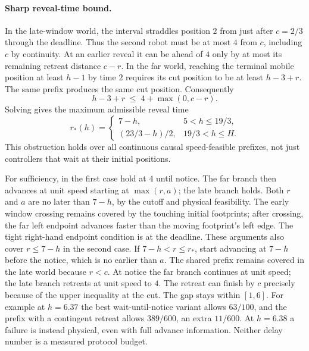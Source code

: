 \documentclass[11pt]{article}
\begin{document}
\paragraph{Sharp reveal-time bound.}
In the late-window world, the interval straddles position \(2\)
from just after \(c=2/3\) through the deadline. Thus the second
robot must be at most \(4\) from \(c\), including \(c\) by continuity.
At an earlier reveal it can be ahead of \(4\) only by at most
its remaining retreat distance \(c-r\). In the far world, reaching
the terminal mobile position at least \(h-1\) by time \(2\)
requires its cut position to be at least \(h-3+r\). The same
prefix produces the same cut position. Consequently
\[
  h-3+r\;\le\;4+\max(0,c-r).
\]
Solving gives the maximum admissible reveal time
\[
 r_*(h)=
 \begin{cases}
 7-h,&5<h\le19/3,\\
 (23/3-h)/2,&19/3<h\le H.
 \end{cases}
\]
This obstruction holds over all continuous causal speed-feasible
prefixes, not just controllers that wait at their initial positions.

For sufficiency, in the first case hold at \(4\) until notice.
The far branch then advances at unit speed starting at
\(\max(r,a)\); the late branch holds. Both \(r\) and \(a\) are no
later than \(7-h\), by the cutoff and physical feasibility.
The early window crossing remains covered by the touching initial
footprints; after crossing, the far left endpoint advances faster
than the moving footprint's left edge. The tight right-hand
endpoint condition is at the deadline. These arguments also
cover \(r\le7-h\) in the second case. If \(7-h<r\le r_*\),
start advancing at \(7-h\) before the notice, which is no earlier
than \(a\). The shared prefix remains covered in the late world
because \(r<c\). At notice the far branch continues at unit speed;
the late branch retreats at unit speed to \(4\). The retreat can
finish by \(c\) precisely because of the upper inequality at the
cut. The gap stays within \([1,6]\). For example at \(h=6.37\)
the best wait-until-notice variant allows \(63/100\), and the
prefix with a contingent retreat allows \(389/600\), an extra
\(11/600\). At \(h=6.38\) a failure is instead physical, even
with full advance information. Neither delay number is a
measured protocol budget.
\end{document}
